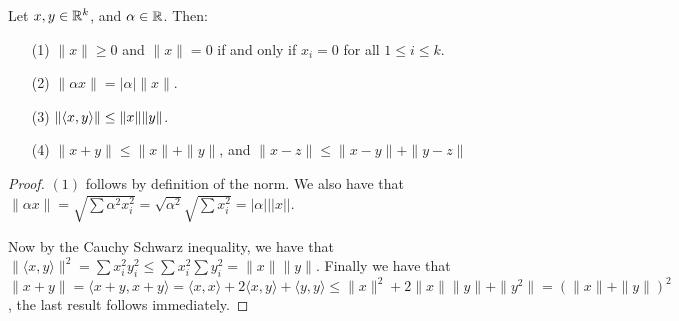 \begin{theorem}\label{1.5.2}
    Let $x,y \in \mathbb{R}^k$, and  $\alpha \in \mathbb{R}$. Then:
         \begin{enumerate}
             \item[(1)] $\|x\| \geq 0$ and $\|x\|=0$ if and only if $x_i=0$ for all $1 \leq i \leq k$.

             \item[(2)] $\|\alpha x\|=|\alpha|\|x\|$.

             \item[(3)] $\|\langle x,y\rangle\| \leq \|x\|\|y\|$.

             \item[(4)] $\|x+y\| \leq \|x\|+\|y\|$, and $\|x-z\| \leq \|x-y\|+\|y-z\|$
        \end{enumerate}
\end{theorem}
\begin{proof}
    $(1)$ follows by definition of the norm. We also have that  $\|\alpha x\|=\sqrt{\sum{\alpha^2x_i^2}}
    =\sqrt{\alpha^2}\sqrt{\sum{x_i^2}}=|\alpha|||x||$.

    Now by the Cauchy Schwarz inequality, we have that $\|\langle x,y \rangle\|^2
    =\sum{x_i^2y_i^2} \leq \sum{x_i^2}\sum{y_i^2}=\|x\|\|y\|$. Finally we have
    that $\|x+y\|=\langle x+y,x+y \rangle=\langle x,x \rangle+2\langle x,y
    \rangle+\langle y,y \rangle \leq \|x\|^2+2\|x\|\|y\|+\|y^2\|=(\|x\|+\|y\|)^2$,
    the last result follows immediately.
\end{proof}
